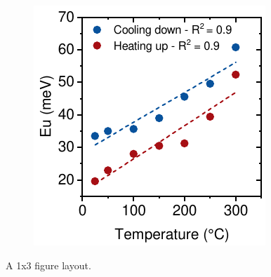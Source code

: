 \begin{figure}[htbp]
\begin{subfigure}{0.32\textwidth}
        \caption{}
        \label{fig:ellipsometry:urbach_cooling}
    \end{subfigure}
    \hfill
    \begin{subfigure}{0.3\textwidth}
        \includegraphics[width=\textwidth]{chapters/ellipsometry/image/Urbach_temp.pdf}
        \caption{}
        \label{fig:ellipsometry:urbach_temp}
    \end{subfigure}
    \caption{A 1x3 figure layout.}
    \label{fig:ellipsometry:urbach}
\end{figure}



